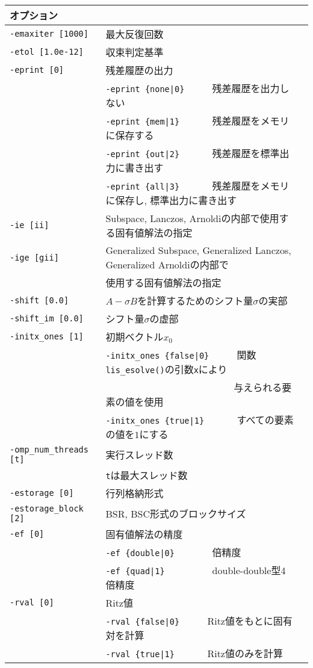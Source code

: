 \documentclass[a4paper]{jarticle}
\begin{document}
{{\begin{minipage}[t]{\textwidth}
\begin{center}
\begin{tabular}{l|ll}\hline\hline
オプション &                          \\ \hline
\verb=-emaxiter [1000]= & 最大反復回数         \\ 
\verb=-etol [1.0e-12]=  & 収束判定基準              \\
\verb=-eprint [0]=      & 残差履歴の出力                 \\
                       & \verb=-eprint {none|0}     =  残差履歴を出力しない \\
                       & \verb=-eprint {mem|1}      =  残差履歴をメモリに保存する\\
                       & \verb=-eprint {out|2}      =  残差履歴を標準出力に書き出す\\
                       & \verb=-eprint {all|3}      =  残差履歴をメモリに保存し, 標準出力に書き出す\\
\verb=-ie [ii]= & Subspace, Lanczos, Arnoldiの内部で使用する固有値解法の指定  \\
\verb=-ige [gii]= & Generalized Subspace, Generalized Lanczos, Generalized Arnoldiの内部で\\
                       & 使用する固有値解法の指定  \\
\verb=-shift [0.0]= & $A-\sigma B$を計算するためのシフト量$\sigma$の実部 \\
\verb=-shift_im [0.0]= & シフト量$\sigma$の虚部 \\
\verb=-initx_ones [1]= & 初期ベクトル$x_{0}$  \\
                       & \verb=-initx_ones {false|0}     =  関数\verb=lis_esolve()=の引数\verb=x=により \\
                       & \verb=                          =  与えられる要素の値を使用 \\
                       & \verb=-initx_ones {true|1}      =  すべての要素の値を$1$にする\\
\verb=-omp_num_threads [t]= & 実行スレッド数         \\ 
                            & \verb=t=は最大スレッド数 \\
\verb=-estorage [0]=   & 行列格納形式 \\
\verb=-estorage_block [2]= & BSR, BSC形式のブロックサイズ \\ 
\verb=-ef [0]=         & 固有値解法の精度 \\
                       & \verb=-ef {double|0}       =   倍精度 \\
                       & \verb=-ef {quad|1}         =   double-double型4倍精度 \\
\verb=-rval [0]=       & Ritz値 \\
                       & \verb=-rval {false|0}     =  Ritz値をもとに固有対を計算 \\
                       & \verb=-rval {true|1}      =  Ritz値のみを計算 \\
\hline         
\end{tabular}
\end{center}
\end{minipage}
\\ \\

}}
\end{document}
